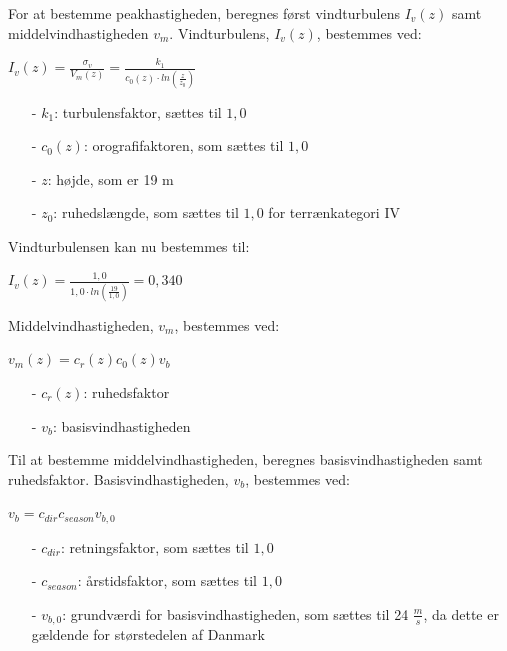 For at bestemme peakhastigheden, beregnes først vindturbulens $I_v(z)$ samt middelvindhastigheden $v_m$.
\newline
\newline
Vindturbulens, $I_v(z)$, bestemmes ved:
\begin{center}
$I_v(z)=\frac{\sigma_v}{V_m(z)}=\frac{k_1}{c_0(z)\cdot ln(\frac{z}{z_0})}$
\end{center}
\begin{itemize}
	\item[-] $k_1$: turbulensfaktor, sættes til $1,\!0$ \citep[ kapitel 4.4]{EU91}
	\item[-] $c_0(z)$: orografifaktoren, som sættes til $1,\!0$ \citep[ kapitel 4.3.1]{EU91}
	\item[-] $z$: højde, som er 19 m
	\item[-] $z_0$: ruhedslængde, som sættes til $1,\!0$ for terrænkategori IV \citep[ tabel 4.1 kapitel 4.3.2]{EU91}
\end{itemize}
Vindturbulensen kan nu bestemmes til:
\begin{center}
$I_v(z)=\frac{1,\!0}{1,\!0\cdot ln(\frac{19}{1,\!0})}=0,\!340$
\end{center}
Middelvindhastigheden, $v_m$, bestemmes ved:
\begin{center}
$v_m(z)=c_r(z)c_0(z)v_b$
\end{center}
\begin{itemize}
	\item[-] $c_r(z)$: ruhedsfaktor
	\item[-] $v_b$: basisvindhastigheden
\end{itemize}
Til at bestemme middelvindhastigheden, beregnes basisvindhastigheden samt ruhedsfaktor.
\newline
\newline
Basisvindhastigheden, $v_b$, bestemmes ved:
\begin{center}
$v_b=c_{dir}c_{season}v_{b,0}$
\end{center}
\begin{itemize}
	\item[-] $c_{dir}$: retningsfaktor, som sættes til $1,\!0$ \citep[ tabel 1a kapitel 4.2]{EU91}
	\item[-] $c_{season}$: årstidsfaktor, som sættes til $1,\!0$ \citep[ tabel 1b kapitel 4.2]{EU91}
	\item[-] $v_{b,0}$: grundværdi for basisvindhastigheden, som sættes til 24 $\frac{m}{s}$, da dette er gældende for størstedelen af Danmark \citep[ kapitel 4.2]{EU91}
\end{itemize}
